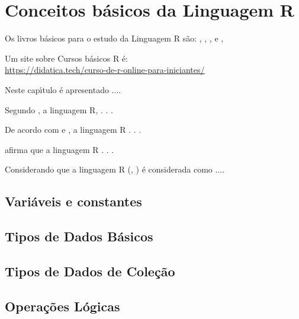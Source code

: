 %


\chapter{ Conceitos b\'{a}sicos da Linguagem R}

Os livros b\'{a}sicos para o estudo da Linguagem R s\~{a}o: \cite{Cotton2013}, \cite{Kabacoff2015}, \cite{Wickham2016}, e \cite{Lander2017}, \cite{Chang2019}

Um site sobre Cursos b\'{a}sicos R \'{e}:\\
 \url{https://didatica.tech/curso-de-r-online-para-iniciantes/}

Neste cap\'{\i}tulo \'{e} apresentado ....

Segundo \cite{Sebesta2018}, a linguagem R,  . . .

De acordo com \cite{Sebesta2018} e \cite{roy04}, a linguagem R . . .

\cite{Sebesta2018} afirma que a linguagem R . . .

Considerando que a linguagem R (\cite{Sebesta2018}, \cite{wat90}) \'{e} considerada como ....

    \section{Vari\'{a}veis e constantes}


    \section{Tipos de Dados B\'{a}sicos}

    \section{Tipos de Dados de Cole\c{c}\~{a}o}

    \section{Opera\c{c}\~{o}es L\'{o}gicas}



